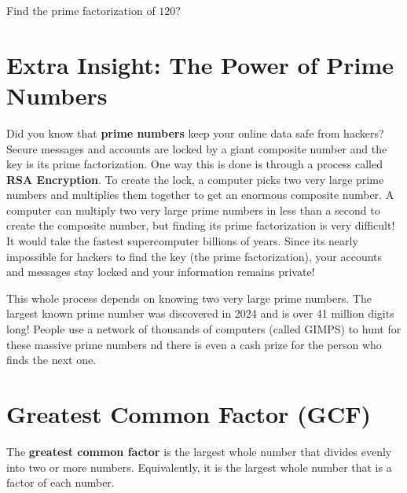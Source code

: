 \documentclass{ximera}[font=12pt]  %
\begin{document}
\begin{problem}
  Find the prime factorization of $120$?

  \begin{multipleChoice}
  \end{multipleChoice}


\end{problem}

\section*{Extra Insight:  The Power of Prime Numbers}

Did you know that \textbf{prime numbers} keep your online data safe from hackers?  Secure messages and accounts are locked by 
a giant composite number and the key is its prime factorization.  One way this is done is through a process called \textbf{RSA Encryption}.  
To create the lock, a computer picks two very large prime numbers and multiplies them together to get an enormous composite number.  
A computer can multiply two very large prime numbers in less than a second to create the composite number, but finding its prime 
factorization is very difficult!  It would take the fastest supercomputer billions of years.  Since its nearly impossible for hackers 
to find the key (the prime factorization), your accounts and messages stay locked and your information remains private!

This whole process depends on knowing two very large prime numbers. The largest known prime number was discovered in 2024 and is 
over 41 million digits long! People use a network of thousands of computers (called GIMPS) to hunt for these massive prime numbers 
nd there is even a cash prize for the person who finds the next one.



\section*{Greatest Common Factor (GCF)}

\begin{definition}
The \textbf{greatest common factor} is the largest whole number that divides evenly into two or more numbers.  Equivalently, it is
the largest whole number that is a factor of each number.

\end{definition}
\end{document}
